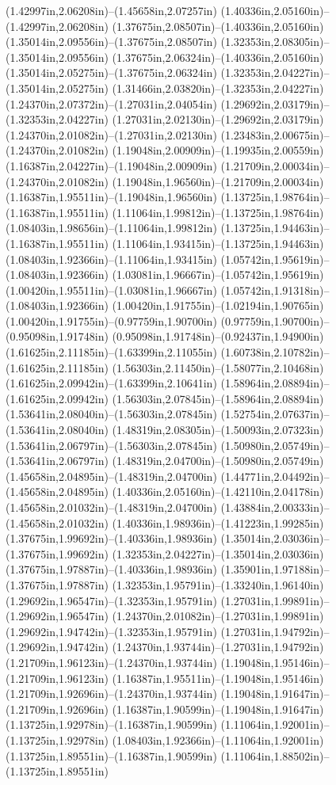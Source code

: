 (1.42997in,2.06208in)--(1.45658in,2.07257in) (1.40336in,2.05160in)--(1.42997in,2.06208in) (1.37675in,2.08507in)--(1.40336in,2.05160in) (1.35014in,2.09556in)--(1.37675in,2.08507in) (1.32353in,2.08305in)--(1.35014in,2.09556in) (1.37675in,2.06324in)--(1.40336in,2.05160in) (1.35014in,2.05275in)--(1.37675in,2.06324in) (1.32353in,2.04227in)--(1.35014in,2.05275in) (1.31466in,2.03820in)--(1.32353in,2.04227in) (1.24370in,2.07372in)--(1.27031in,2.04054in) (1.29692in,2.03179in)--(1.32353in,2.04227in) (1.27031in,2.02130in)--(1.29692in,2.03179in) (1.24370in,2.01082in)--(1.27031in,2.02130in) (1.23483in,2.00675in)--(1.24370in,2.01082in) (1.19048in,2.00909in)--(1.19935in,2.00559in) (1.16387in,2.04227in)--(1.19048in,2.00909in) (1.21709in,2.00034in)--(1.24370in,2.01082in) (1.19048in,1.96560in)--(1.21709in,2.00034in) (1.16387in,1.95511in)--(1.19048in,1.96560in) (1.13725in,1.98764in)--(1.16387in,1.95511in) (1.11064in,1.99812in)--(1.13725in,1.98764in) (1.08403in,1.98656in)--(1.11064in,1.99812in) (1.13725in,1.94463in)--(1.16387in,1.95511in) (1.11064in,1.93415in)--(1.13725in,1.94463in) (1.08403in,1.92366in)--(1.11064in,1.93415in) (1.05742in,1.95619in)--(1.08403in,1.92366in) (1.03081in,1.96667in)--(1.05742in,1.95619in) (1.00420in,1.95511in)--(1.03081in,1.96667in) (1.05742in,1.91318in)--(1.08403in,1.92366in) (1.00420in,1.91755in)--(1.02194in,1.90765in) (1.00420in,1.91755in)--(0.97759in,1.90700in) (0.97759in,1.90700in)--(0.95098in,1.91748in) (0.95098in,1.91748in)--(0.92437in,1.94900in) (1.61625in,2.11185in)--(1.63399in,2.11055in) (1.60738in,2.10782in)--(1.61625in,2.11185in) (1.56303in,2.11450in)--(1.58077in,2.10468in) (1.61625in,2.09942in)--(1.63399in,2.10641in) (1.58964in,2.08894in)--(1.61625in,2.09942in) (1.56303in,2.07845in)--(1.58964in,2.08894in) (1.53641in,2.08040in)--(1.56303in,2.07845in) (1.52754in,2.07637in)--(1.53641in,2.08040in) (1.48319in,2.08305in)--(1.50093in,2.07323in) (1.53641in,2.06797in)--(1.56303in,2.07845in) (1.50980in,2.05749in)--(1.53641in,2.06797in) (1.48319in,2.04700in)--(1.50980in,2.05749in) (1.45658in,2.04895in)--(1.48319in,2.04700in) (1.44771in,2.04492in)--(1.45658in,2.04895in) (1.40336in,2.05160in)--(1.42110in,2.04178in) (1.45658in,2.01032in)--(1.48319in,2.04700in) (1.43884in,2.00333in)--(1.45658in,2.01032in) (1.40336in,1.98936in)--(1.41223in,1.99285in) (1.37675in,1.99692in)--(1.40336in,1.98936in) (1.35014in,2.03036in)--(1.37675in,1.99692in) (1.32353in,2.04227in)--(1.35014in,2.03036in) (1.37675in,1.97887in)--(1.40336in,1.98936in) (1.35901in,1.97188in)--(1.37675in,1.97887in) (1.32353in,1.95791in)--(1.33240in,1.96140in) (1.29692in,1.96547in)--(1.32353in,1.95791in) (1.27031in,1.99891in)--(1.29692in,1.96547in) (1.24370in,2.01082in)--(1.27031in,1.99891in) (1.29692in,1.94742in)--(1.32353in,1.95791in) (1.27031in,1.94792in)--(1.29692in,1.94742in) (1.24370in,1.93744in)--(1.27031in,1.94792in) (1.21709in,1.96123in)--(1.24370in,1.93744in) (1.19048in,1.95146in)--(1.21709in,1.96123in) (1.16387in,1.95511in)--(1.19048in,1.95146in) (1.21709in,1.92696in)--(1.24370in,1.93744in) (1.19048in,1.91647in)--(1.21709in,1.92696in) (1.16387in,1.90599in)--(1.19048in,1.91647in) (1.13725in,1.92978in)--(1.16387in,1.90599in) (1.11064in,1.92001in)--(1.13725in,1.92978in) (1.08403in,1.92366in)--(1.11064in,1.92001in) (1.13725in,1.89551in)--(1.16387in,1.90599in) (1.11064in,1.88502in)--(1.13725in,1.89551in) 